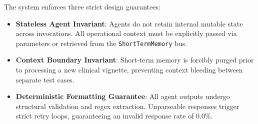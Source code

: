 The system enforces three strict design guarantees:

\begin{itemize}
    \item \textbf{Stateless Agent Invariant}: Agents do not retain internal mutable state across invocations. All operational context must be explicitly passed via parameters or retrieved from the \texttt{ShortTermMemory} bus.
    \item \textbf{Context Boundary Invariant}: Short-term memory is forcibly purged prior to processing a new clinical vignette, preventing context bleeding between separate test cases.
    \item \textbf{Deterministic Formatting Guarantee}: All agent outputs undergo structural validation and regex extraction. Unparseable responses trigger strict retry loops, guaranteeing an invalid response rate of $0.0\%$.
\end{itemize}

